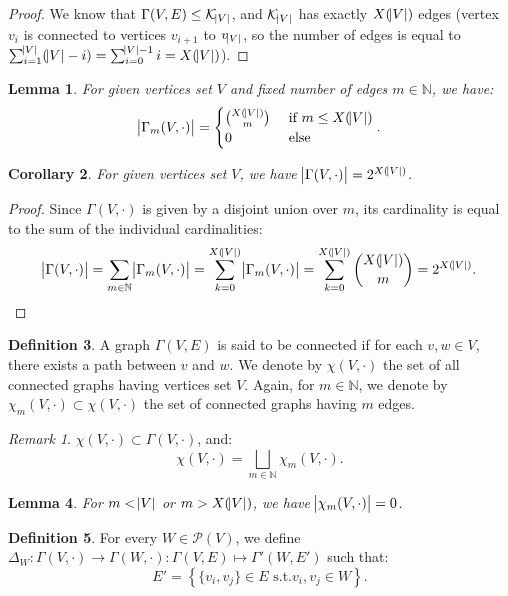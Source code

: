 \documentclass{article}
\newtheorem{lemma}{Lemma}[section]
\newtheorem{corollary}[lemma]{Corollary}
\theoremstyle{definition}
\newtheorem{definition}[lemma]{Definition}
\theoremstyle{remark}
\newtheorem*{remark}{Remark}
\newcommand{\N}{\mathbb N}
\newcommand{\st}{\text{ s.t.}}
\begin{document}
		\begin{proof} We know that $\Gamma(V, E) \leq \mathcal K_{\abs V}$, and $\mathcal K_{\abs V}$ has exactly $X(\abs V)$ edges (vertex $v_i$ is connected
		to vertices $v_{i+1}$ to $v_{\abs V}$, so the number of edges is equal to $\sum_{i=1}^{\abs V}(\abs V - i) = \sum_{i=0}^{\abs V - 1}i = X(\abs V)$).
		\end{proof}

		\begin{lemma} For given vertices set $V$ and fixed number of edges $m \in \N$, we have:
		\[\abs {\Gamma_m(V, \cdot)} = \begin{cases}\binom {X(\abs V)}m &\text{ if } m \leq X(\abs V) \\0 &\text{ else}\end{cases}.\]
		\end{lemma}

		\begin{corollary} For given vertices set $V$, we have $\abs {\Gamma(V, \cdot)} = 2^{X(\abs V)}$.
		\end{corollary}

		\begin{proof} Since $\Gamma(V, \cdot)$ is given by a disjoint union over $m$, its cardinality is equal to the sum of the individual cardinalities:
		\[\abs {\Gamma(V, \cdot)} = \sum_{m \in \N}\abs {\Gamma_m(V, \cdot)} = \sum_{k=0}^{X(\abs V)}\abs {\Gamma_m(V, \cdot)} = \sum_{k=0}^{X(\abs V)}\binom {X(\abs V)}m = 2^{X(\abs V)}.\]
		\end{proof}

		\begin{definition} A graph $\Gamma(V, E)$ is said to be connected if for each $v, w \in V$, there exists a path between $v$ and $w$. We denote by $\chi(V, \cdot)$ the
		set of all connected graphs having vertices set $V$. Again, for $m \in \N$, we denote by $\chi_m(V, \cdot) \subset \chi(V, \cdot)$ the set of connected graphs having $m$ edges.
		\end{definition}

		\begin{remark} $\chi(V, \cdot) \subset \Gamma(V, \cdot)$, and:
		\[\chi(V, \cdot) = \bigsqcup_{m \in \N}\chi_m(V, \cdot).\]
		\end{remark}

		\begin{lemma} For $m < \abs V$ or $m > X(\abs V)$, we have $\abs {\chi_m(V, \cdot)} = 0$.
		\end{lemma}

		\begin{definition} For every $W \in \mathcal P(V)$, we define $\Delta_W : \Gamma(V, \cdot) \to \Gamma(W, \cdot) : \Gamma(V, E) \mapsto \Gamma'(W, E')$
		such that:
		\[E' = \left\{\{v_i, v_j\} \in E \st v_i, v_j \in W\right\}.\]
		\end{definition}
\end{document}
